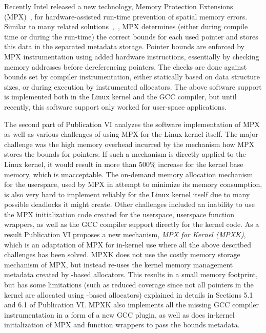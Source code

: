 Recently Intel released a new technology, \intel Memory Protection Extensions (MPX)~\cite{ramakesavan2015intel}, for hardware-assisted run-time prevention of spatial memory errors.  Similar to many related solutions~\cite{jones1997backwards},~\cite{nagarakatte2009softbound}, MPX determines (either during compile time or during the run-time) the correct bounds for each used pointer and stores this data in the separated metadata storage. Pointer bounds are enforced by MPX instrumentation using added hardware instructions, essentially by checking memory addresses before dereferencing pointers. The checks are done against bounds set by compiler instrumentation, either statically based on data structure sizes, or during execution by instrumented allocators. The above software support is implemented both in the Linux kernel and the GCC compiler, but until recently, this software support only worked for user-space applications. 
 
The second part of Publication VI analyzes the software implementation of \intel MPX as well as various challenges of using MPX for the Linux kernel itself. The major challenge was the high memory overhead incurred by the mechanism how MPX stores the bounds for pointers. If such a mechanism is directly applied to the Linux kernel, it would result in more than $500\%$ increase for the kernel base memory, which is unacceptable. The on-demand memory allocation mechanism for the userspace, used by MPX in attempt to minimize its memory consumption, is also very hard to implement reliably for the Linux kernel itself due to many possible deadlocks it might create. Other challenges included an inability to use the MPX initialization code created for the userspace, userspace function wrappers, as well as the GCC compiler support directly for the kernel code.
As a result Publication VI proposes a new mechanism, \emph{MPX for Kernel (MPXK)}, which is an adaptation of \intel MPX for in-kernel use where all the above described challenges has been solved. MPXK does not use the costly memory storage mechanism of MPX, but instead re-uses the kernel memory management metadata created by -based allocators. This results in a small memory footprint, but has some limitations (such as reduced coverage since not all pointers in the kernel are allocated using -based allocators) explained in details in Sections 5.1 and 6.1 of Publication VI. MPXK also implements all the missing GCC compiler instrumentation in a form of a new GCC plugin, as well as does in-kernel initialization of MPX and function wrappers to pass the bounds metadata. 


